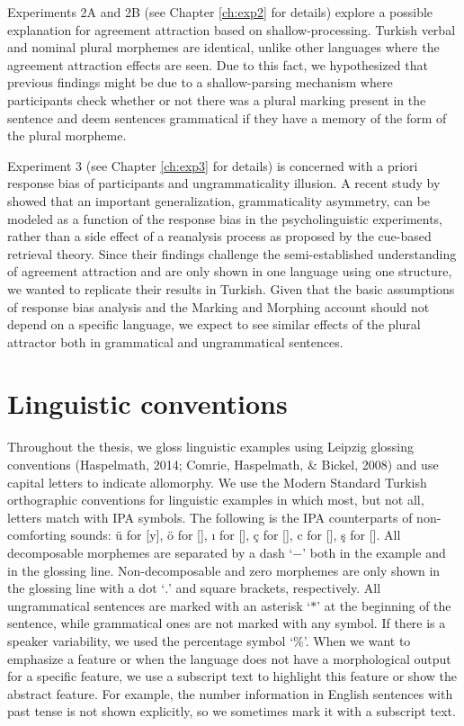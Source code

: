 Experiments 2A and 2B (see Chapter \ref{ch:exp2} for details) explore a possible explanation for agreement attraction based on shallow-processing. Turkish verbal and nominal plural morphemes are identical, unlike other languages where the agreement attraction effects are seen. Due to this fact, we hypothesized that previous findings might be due to a shallow-parsing mechanism where participants check whether or not there was a plural marking present in the sentence and deem sentences grammatical if they have a memory of the form of the plural morpheme. 

Experiment 3 (see Chapter \ref{ch:exp3} for details) is concerned with a priori response bias of participants and ungrammaticality illusion. A recent study by  showed that an important generalization, grammaticality asymmetry, can be modeled as a function of the response bias in the psycholinguistic experiments, rather than a side effect of a reanalysis process as proposed by the cue-based retrieval theory. Since their findings challenge the semi-established understanding of agreement attraction and are only shown in one language using one structure, we wanted to replicate their results in Turkish. Given that the basic assumptions of response bias analysis and the Marking and Morphing account should not depend on a specific language, we expect to see similar effects of the plural attractor both in grammatical and ungrammatical sentences.

\section{Linguistic conventions}

Throughout the thesis, we gloss linguistic examples using Leipzig glossing conventions (Haspelmath, 2014; Comrie, Haspelmath, \& Bickel, 2008) and use capital letters to indicate allomorphy. We use the Modern Standard Turkish orthographic conventions for linguistic examples in which most, but not all, letters match with IPA symbols. The following is the IPA counterparts of non-comforting sounds: \"u for [y], \"o for [\textipa{\o}], {\i} for [], \c{c} for [\textteshlig], c for [\textdyoghlig], \c{s} for [\textesh]. All decomposable morphemes  are separated by a dash `$-$' both in the example and in the glossing line. Non-decomposable and zero morphemes are only shown in the glossing line with a dot `$.$' and square brackets, respectively. All ungrammatical sentences are marked with an asterisk `$*$' at the beginning of the sentence, while grammatical ones are not marked with any symbol. If there is a speaker variability, we used the percentage symbol `$\%$'. When we want to emphasize a feature or when the language does not have a morphological output for a specific feature, we use a subscript text to highlight this feature or show the abstract feature. For example, the number information in English sentences with past tense is not shown explicitly, so we sometimes mark it with a subscript text.

